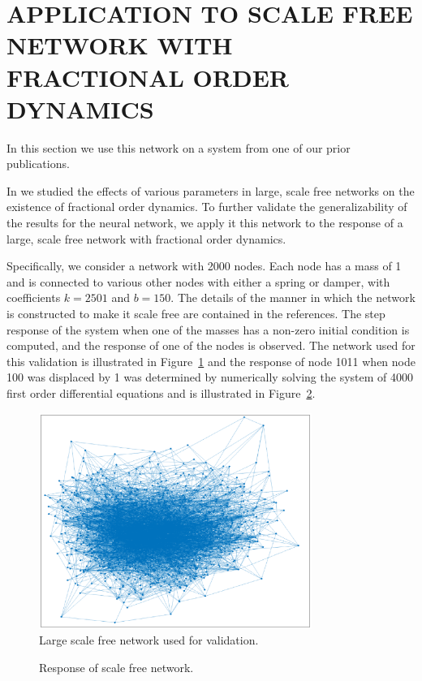 \section{APPLICATION TO SCALE FREE NETWORK WITH FRACTIONAL ORDER DYNAMICS}
\label{sec:scalefree}

In this section we use this network on a system from one of our prior
publications. 

In \cite{goodwinemed2023,goodwinemmar2023} we studied the effects of various
parameters in large, scale free networks on the existence of fractional order
dynamics. To further validate the generalizability of the results for the neural
network, we apply it this network to the response of a large, scale free network
with fractional order dynamics. 

Specifically, we consider a network with 2000 nodes. Each node has a mass of 1
and is connected to various other nodes with either a spring or damper, with
coefficients $k = 2501$ and $b = 150$. The details of the manner in which the
network is constructed to make it scale free are contained in the references.
The step response of the system when one of the masses has a non-zero initial
condition is computed, and the response of one of the nodes is observed. The
network used for this validation is illustrated in Figure~\ref{fig:network} and
the response of node 1011 when node 100 was displaced by 1 was determined by
numerically solving the system of 4000 first order differential equations and is
illustrated in Figure~\ref{fig:sfresp}.

\begin{figure}
\centering
\includegraphics[width=3.5in]{network}
\caption{Large scale free network used for validation.}
\label{fig:network}
\end{figure}

\begin{figure}
\centering

\vspace*{-5pt}
\caption{Response of scale free network.}
\label{fig:sfresp}
\end{figure}

